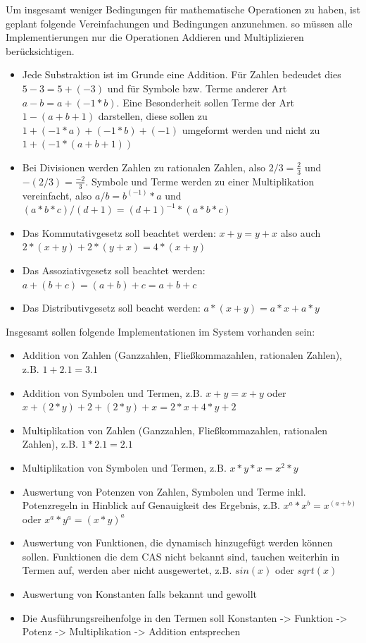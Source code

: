 \documentclass[11pt,a4paper, ngerman]{article}
\begin{document}
Um insgesamt weniger Bedingungen für mathematische Operationen zu haben, ist geplant folgende Vereinfachungen und Bedingungen anzunehmen. so müssen alle Implementierungen nur die Operationen Addieren und Multiplizieren berücksichtigen.
\begin{itemize}
    \item Jede Substraktion ist im Grunde eine Addition. Für Zahlen bedeudet dies $5-3 = 5+(-3)$ und für Symbole bzw. Terme anderer Art $a-b = a+(-1 * b)$. Eine Besonderheit sollen Terme der Art $1-(a+b+1)$ darstellen, diese sollen zu $1+(-1*a)+(-1*b)+(-1)$ umgeformt werden und nicht zu $1+(-1*(a+b+1))$
    \item Bei Divisionen werden Zahlen zu rationalen Zahlen, also $2/3 = \frac{2}{3}$ und $-(2/3) = \frac{-2}{3}$. Symbole und Terme werden zu einer Multiplikation vereinfacht, also $a/b = b^{(-1)} * a$ und $(a*b*c)/(d+1) = (d+1)^{-1} * (a*b*c)$
    \item Das Kommutativgesetz soll beachtet werden: $x+y = y+x$ also auch $2*(x+y) + 2*(y+x) = 4*(x+y)$
    \item Das Assoziativgesetz soll beachtet werden: $a+(b+c) = (a+b)+c = a+b+c$
    \item Das Distributivgesetz soll beacht werden: $a*(x+y) = a*x + a*y$
\end{itemize}

Insgesamt sollen folgende Implementationen im System vorhanden sein:
\begin{itemize}
    \item Addition von Zahlen (Ganzzahlen, Fließkommazahlen, rationalen Zahlen), z.B. $1+2.1 = 3.1$
    \item Addition von Symbolen und Termen, z.B. $x+y = x+y$ oder $x+(2*y)+2+(2*y)+x = 2*x+4*y+2$
    \item Multiplikation von Zahlen (Ganzzahlen, Fließkommazahlen, rationalen Zahlen), z.B. $1*2.1 = 2.1$
    \item Multiplikation von Symbolen und Termen, z.B. $x*y*x = x^2*y$
    \item Auswertung von Potenzen von Zahlen, Symbolen und Terme inkl. Potenzregeln in Hinblick auf Genauigkeit des Ergebnis, z.B. $x^a*x^b=x^(a+b)$ oder $x^a*y^a = (x*y)^a$
    \item Auswertung von Funktionen, die dynamisch hinzugefügt werden können sollen. Funktionen die dem CAS nicht bekannt sind, tauchen weiterhin in Termen auf, werden aber nicht ausgewertet, z.B. $sin(x)$ oder $sqrt(x)$
    \item Auswertung von Konstanten falls bekannt und gewollt
    \item Die Ausführungsreihenfolge in den Termen soll Konstanten -> Funktion -> Potenz -> Multiplikation -> Addition entsprechen
\end{itemize}
\end{document}
